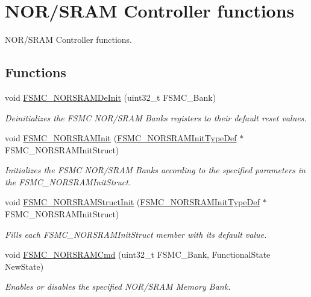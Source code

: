 \hypertarget{group___f_s_m_c___group1}{}\section{N\+O\+R/\+S\+R\+A\+M Controller functions}
\label{group___f_s_m_c___group1}


N\+O\+R/\+S\+R\+A\+M Controller functions.  


\subsection*{Functions}
\begin{DoxyCompactItemize}
\item 
void \hyperlink{group___f_s_m_c___group1_gaab3e6648e8a584e73785361ac960eded}{F\+S\+M\+C\+\_\+\+N\+O\+R\+S\+R\+A\+M\+De\+Init} (uint32\+\_\+t F\+S\+M\+C\+\_\+\+Bank)
\begin{DoxyCompactList}\small\item\em Deinitializes the F\+S\+M\+C N\+O\+R/\+S\+R\+A\+M Banks registers to their default reset values. \end{DoxyCompactList}\item 
void \hyperlink{group___f_s_m_c___group1_ga9c27816e8b17394c9ee1ce9298917b4a}{F\+S\+M\+C\+\_\+\+N\+O\+R\+S\+R\+A\+M\+Init} (\hyperlink{struct_f_s_m_c___n_o_r_s_r_a_m_init_type_def}{F\+S\+M\+C\+\_\+\+N\+O\+R\+S\+R\+A\+M\+Init\+Type\+Def} $\ast$F\+S\+M\+C\+\_\+\+N\+O\+R\+S\+R\+A\+M\+Init\+Struct)
\begin{DoxyCompactList}\small\item\em Initializes the F\+S\+M\+C N\+O\+R/\+S\+R\+A\+M Banks according to the specified parameters in the F\+S\+M\+C\+\_\+\+N\+O\+R\+S\+R\+A\+M\+Init\+Struct. \end{DoxyCompactList}\item 
void \hyperlink{group___f_s_m_c___group1_gaf33e6dfc34f62d16a0cb416de9e83d28}{F\+S\+M\+C\+\_\+\+N\+O\+R\+S\+R\+A\+M\+Struct\+Init} (\hyperlink{struct_f_s_m_c___n_o_r_s_r_a_m_init_type_def}{F\+S\+M\+C\+\_\+\+N\+O\+R\+S\+R\+A\+M\+Init\+Type\+Def} $\ast$F\+S\+M\+C\+\_\+\+N\+O\+R\+S\+R\+A\+M\+Init\+Struct)
\begin{DoxyCompactList}\small\item\em Fills each F\+S\+M\+C\+\_\+\+N\+O\+R\+S\+R\+A\+M\+Init\+Struct member with its default value. \end{DoxyCompactList}\item 
void \hyperlink{group___f_s_m_c___group1_gaf943f0f2680168d3a95a3c2c9f3eca2a}{F\+S\+M\+C\+\_\+\+N\+O\+R\+S\+R\+A\+M\+Cmd} (uint32\+\_\+t F\+S\+M\+C\+\_\+\+Bank, Functional\+State New\+State)
\begin{DoxyCompactList}\small\item\em Enables or disables the specified N\+O\+R/\+S\+R\+A\+M Memory Bank. \end{DoxyCompactList}\end{DoxyCompactItemize}


